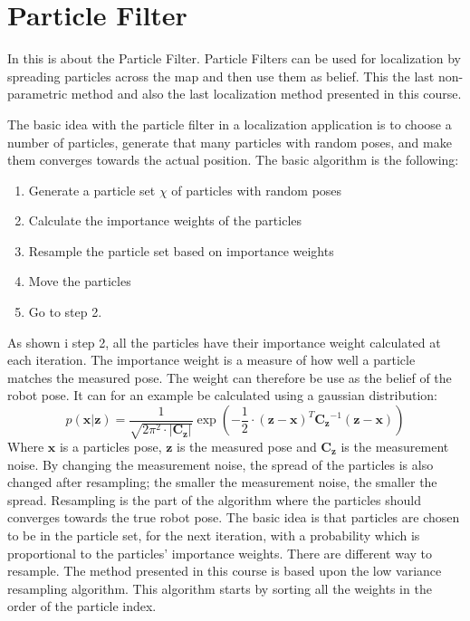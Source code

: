 \documentclass[Main]{subfiles}
\begin{document}
\section{Particle Filter} %
	\label{sec:particlefilter}
In this is about the Particle Filter. 
Particle Filters can be used for localization by spreading particles across the map and then use them as belief. This the last non-parametric method and also the last localization method presented in this course.

The basic idea with the particle filter in a localization application is to choose a number of particles, generate that many particles with random poses, and make them converges towards the actual position.
The basic algorithm is the following:
\begin{enumerate}
\item Generate a particle set $\chi$ of particles with random poses 
\item Calculate the importance weights of the particles 
\item Resample the particle set based on importance weights
\item Move the particles
\item Go to step 2.
\end{enumerate}
As shown i step 2, all the particles have their importance weight calculated at each iteration.
The importance weight is a measure of how well a particle matches the measured pose.
The weight can therefore be use as the belief of the robot pose.
It can for an example be calculated using a gaussian distribution:
\begin{equation}
	p(\mathbf{x}|\mathbf{z}) = \frac{1}{\sqrt{2\pi^2 \cdot |\mathbf{C_z}|}} \exp \left( -\frac{1}{2}\cdot (\mathbf{z}-\mathbf{x})^T \mathbf{C_z}^{-1} (\mathbf{z}-\mathbf{x}) \right)
\end{equation}
Where $\mathbf{x}$ is a particles pose, $\mathbf{z}$ is the measured pose and $\mathbf{C_z}$ is the measurement noise.
By changing the measurement noise, the spread of the particles is also changed after resampling; the smaller the measurement noise, the smaller the spread.
Resampling is the part of the algorithm where the particles should converges towards the true robot pose.
The basic idea is that particles are chosen to be in the particle set, for the next iteration, with a probability which is proportional to the particles' importance weights.
There are different way to resample.
The method presented in this course is based upon the low variance resampling algorithm.
This algorithm starts by sorting all the weights in the order of the particle index.
\end{document}
